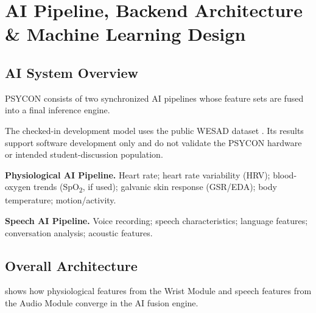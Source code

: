 \section{AI Pipeline, Backend Architecture \& Machine Learning Design}
\label{sec:ai-pipeline-design}

\subsection{AI System Overview}
\label{sec:ai-system-overview}

PSYCON consists of two synchronized AI pipelines whose feature sets are fused into a final inference engine.

The checked-in development model uses the public WESAD dataset \cite{schmidt_wesad_2018}. Its results support software development only and do not validate the PSYCON hardware or intended student-discussion population.

\textbf{Physiological AI Pipeline.} Heart rate; heart rate variability (HRV); blood-oxygen trends (SpO\textsubscript{2}, if used); galvanic skin response (GSR/EDA); body temperature; motion/activity.

\textbf{Speech AI Pipeline.} Voice recording; speech characteristics; language features; conversation analysis; acoustic features.

\subsection{Overall Architecture}
\label{sec:ai-overall-architecture}

 shows how physiological features from the Wrist Module and speech features from the Audio Module converge in the AI fusion engine.

